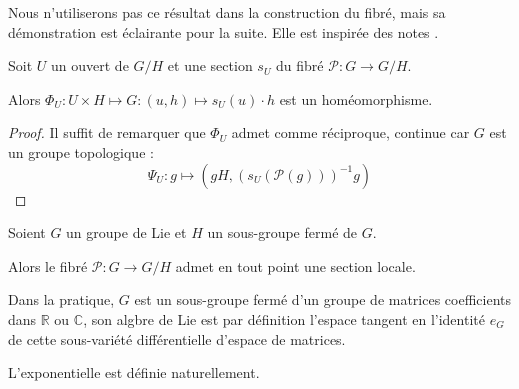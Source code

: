Nous n'utiliserons pas ce r\'esultat dans la construction du fibr\'e, %
mais sa d\'emonstration est \'eclairante pour la suite. %
Elle est inspir\'ee des notes \cite{ex_par}.

\begin{lemm}
Soit $U$ un ouvert de $G/H$ et une section $s_U$ du fibr\'e $\mathcal{P}:G\rightarrow G/H$.

\par
Alors $\Phi_U:U\times H\mapsto G:(u,h)\mapsto s_U(u)\cdot h$ est un hom\'eomorphisme.
\end{lemm}

\begin{proof}
Il suffit de remarquer que $\Phi_U$ admet comme r\'eciproque, continue car $G$ est un groupe topologique :
\[\Psi_U:g\mapsto \left(gH,\left(s_U(\mathcal{P}(g))\right)^{-1}g\right)\]
\end{proof}

\begin{lemm}\label{sfl}
Soient $G$ un groupe de Lie et $H$ un sous-groupe ferm\'e de $G$.

\par
Alors le fibr\'e $\mathcal{P}:G\rightarrow G/H$ admet en tout point une section locale.
\end{lemm}

\begin{rema}
Dans la pratique, $G$ est un sous-groupe ferm\'e d'un groupe de matrices  coefficients dans $\mathbb{R}$ ou $\mathbb{C}$, %
son algbre de Lie est par d\'efinition l'espace tangent en l'identit\'e $e_G$ de cette sous-vari\'et\'e diff\'erentielle d'espace de matrices.

\par
L'exponentielle est d\'efinie naturellement.
\end{rema}

